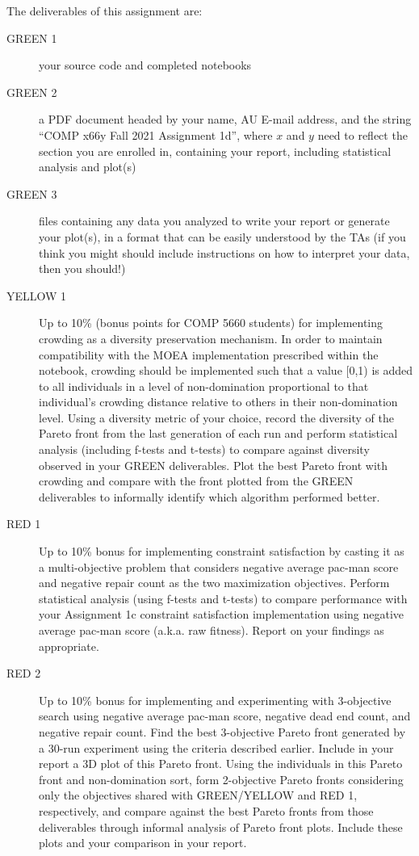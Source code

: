 \documentclass{article}
\begin{document}
The deliverables of this assignment are:
\begin{description}
\item[GREEN 1] your source code and completed notebooks
\item[GREEN 2] a PDF document headed by your name, AU E-mail address, and the string ``COMP x66y Fall 2021 Assignment 1d'', where $x$ and $y$ need to reflect the section you are enrolled in, containing your report, including statistical analysis and plot(s)
\item[GREEN 3] files containing any data you analyzed to write your report or generate your plot(s), in a format that can be easily understood by the TAs (if you think you might should include instructions on how to interpret your data, then you should!)
\item[YELLOW 1] Up to 10\% (bonus points for COMP 5660 students) for implementing crowding as a diversity preservation mechanism. In order to maintain compatibility with the MOEA implementation prescribed within the notebook, crowding should be implemented such that a value [0,1) is added to all individuals in a level of non-domination proportional to that individual's crowding distance relative to others in their non-domination level. Using a diversity metric of your choice, record the diversity of the Pareto front from the last generation of each run and perform statistical analysis (including f-tests and t-tests) to compare against diversity observed in your GREEN deliverables. Plot the best Pareto front with crowding and compare with the front plotted from the GREEN deliverables to informally identify which algorithm performed better.
\item[RED 1] Up to 10\% bonus for implementing constraint satisfaction by casting it as a multi-objective problem that considers negative average pac-man score and negative repair count as the two maximization objectives. Perform statistical analysis (using f-tests and t-tests) to compare performance with your Assignment 1c constraint satisfaction implementation using negative average pac-man score (a.k.a. raw fitness). Report on your findings as appropriate.
\item[RED 2] Up to 10\% bonus for implementing and experimenting with 3-objective search using negative average pac-man score, negative dead end count, and negative repair count. Find the best 3-objective Pareto front generated by a 30-run experiment using the criteria described earlier. Include in your report a 3D plot of this Pareto front. Using the individuals in this Pareto front and non-domination sort, form 2-objective Pareto fronts considering only the objectives shared with GREEN/YELLOW and RED 1, respectively, and compare against the best Pareto fronts from those deliverables through informal analysis of Pareto front plots. Include these plots and your comparison in your report.

\end{description}
\end{document}
